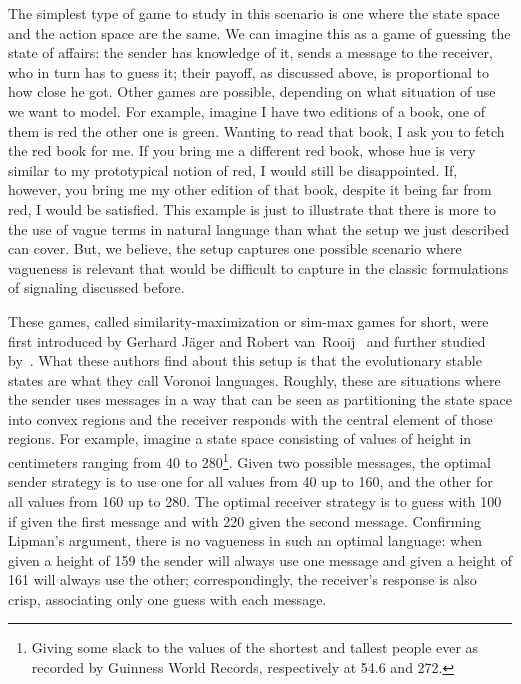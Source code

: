 \documentclass[a4paper]{article}
\begin{document}
The simplest type of game to study in this scenario is one where the state space and the action space are the same.
We can imagine this as a game of guessing the state of affairs: the sender has knowledge of it, sends a message to the receiver, who in turn has to guess it; their payoff, as discussed above, is proportional to how close he got.
Other games are possible, depending on what situation of use we want to model.
For example, imagine I have two editions of a book, one of them is red the other one is green.
Wanting to read that book, I ask you to fetch the red book for me.
If you bring me a different red book, whose hue is very similar to my prototypical notion of red, I would still be disappointed.
If, however, you bring me my other edition of that book, despite it being far from red, I would be satisfied.
This example is just to illustrate that there is more to the use of vague terms in natural language than what the setup we just described can cover.
But, we believe, the setup captures one possible scenario where vagueness is relevant that would be difficult to capture in the classic formulations of signaling discussed before.

These games, called similarity-maximization or sim-max games for short, were first introduced by Gerhard J{\"a}ger and Robert van~Rooij~\parencite{jager_language_2007,Jager2007} and further studied by~\textcite{jager_voronoi_2011}.
What these authors find about this setup is that the evolutionary stable states are what they call Voronoi languages.
Roughly, these are situations where the sender uses messages in a way that can be seen as partitioning the state space into convex regions and the receiver responds with the central element of those regions.
For example, imagine a state space consisting of values of height in centimeters ranging from 40 to 280\footnote{Giving some slack to the values of the shortest and tallest people ever as recorded by Guinness World Records, respectively at 54.6 and 272.}.
Given two possible messages, the optimal sender strategy is to use one for all values from 40 up to 160, and the other for all values from 160 up to 280.
The optimal receiver strategy is to guess with 100 if given the first message and with 220 given the second message.
Confirming Lipman's argument, there is no vagueness in such an optimal language: when given a height of 159 the sender will always use one message and given a height of 161 will always use the other; correspondingly, the receiver's response is also crisp, associating only one guess with each message.
\end{document}
